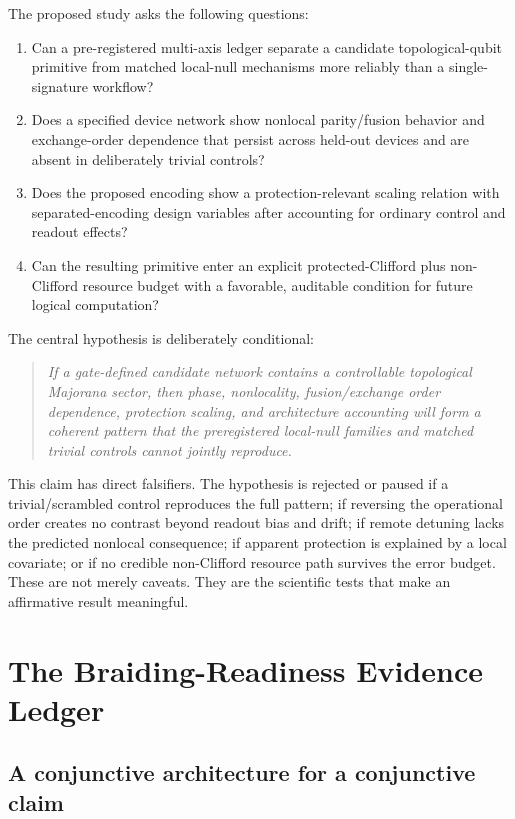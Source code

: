 \documentclass[conference]{IEEEtran}
\begin{document}
The proposed study asks the following questions:
\begin{enumerate}
\item Can a pre-registered multi-axis ledger separate a candidate topological-qubit primitive from matched local-null mechanisms more reliably than a single-signature workflow?
\item Does a specified device network show nonlocal parity/fusion behavior and exchange-order dependence that persist across held-out devices and are absent in deliberately trivial controls?
\item Does the proposed encoding show a protection-relevant scaling relation with separated-encoding design variables after accounting for ordinary control and readout effects?
\item Can the resulting primitive enter an explicit protected-Clifford plus non-Clifford resource budget with a favorable, auditable condition for future logical computation?
\end{enumerate}

The central hypothesis is deliberately conditional:
\begin{quote}
\emph{If a gate-defined candidate network contains a controllable topological Majorana sector, then phase, nonlocality, fusion/exchange order dependence, protection scaling, and architecture accounting will form a coherent pattern that the preregistered local-null families and matched trivial controls cannot jointly reproduce.}
\end{quote}

This claim has direct falsifiers. The hypothesis is rejected or paused if a trivial/scrambled control reproduces the full pattern; if reversing the operational order creates no contrast beyond readout bias and drift; if remote detuning lacks the predicted nonlocal consequence; if apparent protection is explained by a local covariate; or if no credible non-Clifford resource path survives the error budget. These are not merely caveats. They are the scientific tests that make an affirmative result meaningful.

\section{The Braiding-Readiness Evidence Ledger}

\subsection{A conjunctive architecture for a conjunctive claim}
\end{document}
